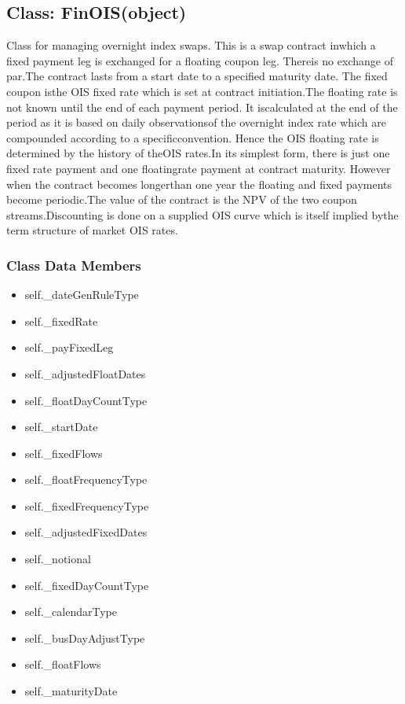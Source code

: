 \documentclass[twoside,11pt]{book}
\begin{document}
\subsection{Class: FinOIS(object)}
Class for managing overnight index swaps. This is a swap contract inwhich a fixed payment leg is exchanged for a floating coupon leg. Thereis no exchange of par.The contract lasts from a start date to a specified maturity date. The fixed coupon isthe OIS fixed rate which is set at contract initiation.The floating rate is not known until the end of each payment period. It iscalculated at the end of the period as it is based on daily observationsof the overnight index rate which are compounded according to a specificconvention. Hence the OIS floating rate is determined by the history of theOIS rates.In its simplest form, there is just one fixed rate payment and one floatingrate payment at contract maturity. However when the contract becomes longerthan one year the floating and fixed payments become periodic.The value of the contract is the NPV of the two coupon streams.Discounting is done on a supplied OIS curve which is itself implied bythe term structure of market OIS rates. 

\subsubsection{Class Data Members}
\begin{itemize}
\item{self.\_dateGenRuleType}
\item{self.\_fixedRate}
\item{self.\_payFixedLeg}
\item{self.\_adjustedFloatDates}
\item{self.\_floatDayCountType}
\item{self.\_startDate}
\item{self.\_fixedFlows}
\item{self.\_floatFrequencyType}
\item{self.\_fixedFrequencyType}
\item{self.\_adjustedFixedDates}
\item{self.\_notional}
\item{self.\_fixedDayCountType}
\item{self.\_calendarType}
\item{self.\_busDayAdjustType}
\item{self.\_floatFlows}
\item{self.\_maturityDate}
\end{itemize}
\end{document}
